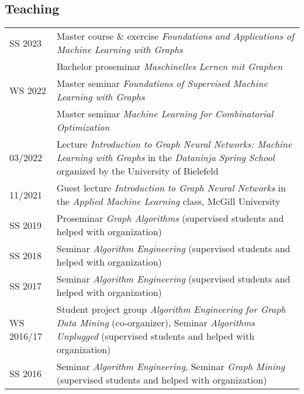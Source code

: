 \documentclass[10pt, a4paper, DIV=14, headings=small]{scrartcl}
\begin{document}
\subsection*{Teaching}
\begin{longtabu}{p{2.1cm}p{12.0cm}}
	SS 2023    & Master course \& exercise \emph{Foundations and Applications of Machine Learning with Graphs}                                                                                   \\
	           & Bachelor proseminar \emph{Maschinelles Lernen mit Graphen}                                                                                                                      \\
	WS 2022    & Master seminar \emph{Foundations of Supervised Machine Learning with Graphs}                                                                                                    \\
	           & Master seminar \emph{Machine Learning for Combinatorial Optimization}                                                                                                           \\
	03/2022    & Lecture \emph{Introduction to Graph Neural Networks: Machine Learning with Graphs} in the \emph{Dataninja Spring School} organized by the University of Bielefeld               \\
	11/2021    & Guest lecture \emph{Introduction to Graph Neural Networks} in the \emph{Applied Machine Learning} class, McGill University                                                      \\
	SS 2019    & Proseminar \emph{Graph Algorithms} (supervised students and helped with organization)                                                                                           \\
	SS 2018    & Seminar \emph{Algorithm Engineering} (supervised students and helped with organization)                                                                                         \\
	SS 2017    & Seminar \emph{Algorithm Engineering} (supervised students and helped with organization)                                                                                         \\
	WS 2016/17 & Student project group \emph{Algorithm Engineering for Graph Data Mining} (co-organizer), Seminar \emph{Algorithms Unplugged} (supervised students and helped with organization) \\
	SS 2016    & Seminar \emph{Algorithm Engineering}, Seminar \emph{Graph Mining} (supervised students and helped with organization)                                                            \\

\end{longtabu}
\end{document}
